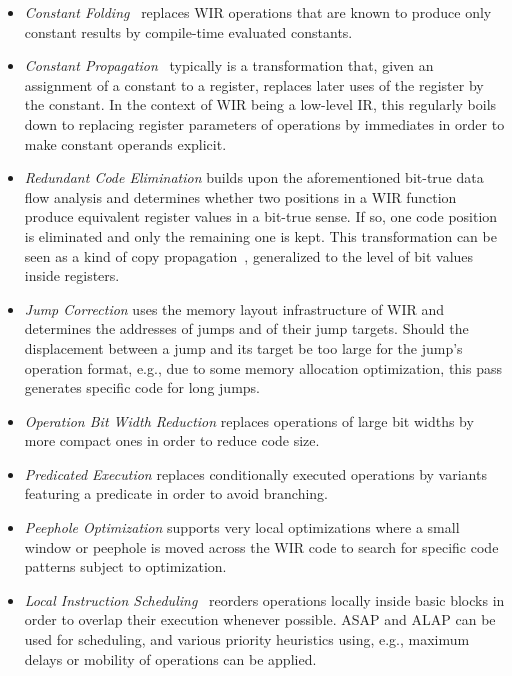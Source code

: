 \begin{itemize}
  \item \textit{Constant Folding}~\cite[chapter~12.1]{Much97} replaces \gls{WIR} operations that are known to produce only constant results by compile-time evaluated constants.

  \item \textit{Constant Propagation}~\cite[chapter~12.6]{Much97} typically is a transformation that, given an assignment of a constant to a register, replaces later uses of the register by the constant.
  In the context of \gls{WIR} being a low-level \gls{IR}, this regularly boils down to replacing register parameters of operations by immediates in order to make constant operands explicit.

  \item \textit{Redundant Code Elimination} builds upon the aforementioned bit-true data flow analysis and determines whether two positions in a \gls{WIR} function produce equivalent register values in a bit-true sense.
  If so, one code position is eliminated and only the remaining one is kept.
  This transformation can be seen as a kind of copy propagation~\cite[chapter~17.3]{Appel04}\cite[chapter~12.5]{Much97}, generalized to the level of bit values inside registers.

  \item \textit{Jump Correction} uses the memory layout infrastructure of \gls{WIR} and determines the addresses of jumps and of their jump targets.
  Should the displacement between a jump and its target be too large for the jump's operation format, e.g., due to some memory allocation optimization, this pass generates specific code for long jumps.

  \item \textit{Operation Bit Width Reduction} replaces operations of large bit widths by more compact ones in order to reduce code size.

  \item \textit{Predicated Execution} replaces conditionally executed operations by variants featuring a predicate in order to avoid branching.

  \item \textit{Peephole Optimization} supports very local optimizations where a small window or peephole is moved across the \gls{WIR} code to search for specific code patterns subject to optimization.

  \item \textit{Local Instruction Scheduling}~\cite[chapter~13.2]{Much97} reorders operations locally inside basic blocks in order to overlap their execution whenever possible.
  \gls{ASAP} and \gls{ALAP} can be used for scheduling, and various priority heuristics using, e.g., maximum delays or mobility of operations can be applied.
\end{itemize}

